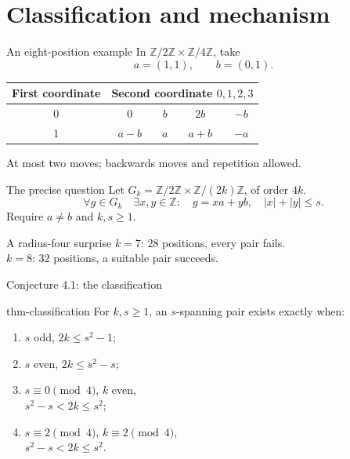 \documentclass{beamer}
\begin{document}
\section{Classification and mechanism}
\begin{frame}{An eight-position example}
In $\mathbb Z/2\mathbb Z\times\mathbb Z/4\mathbb Z$, take
\[a=(1,1),\qquad b=(0,1).\]
\begin{center}
\begin{tabular}{c|cccc}
First coordinate & \multicolumn{4}{c}{Second coordinate $0,1,2,3$}\\\hline
$0$ & $0$ & $b$ & $2b$ & $-b$\\
$1$ & $a-b$ & $a$ & $a+b$ & $-a$
\end{tabular}
\end{center}
At most two moves; backwards moves and repetition allowed.
\end{frame}
\begin{frame}{The precise question}
Let $G_k=\mathbb Z/2\mathbb Z\times\mathbb Z/(2k)\mathbb Z$, of order $4k$.
\[\forall g\in G_k\quad \exists x,y\in\mathbb Z:\quad
 g=xa+yb,\quad |x|+|y|\le s.\]
Require $a\ne b$ and $k,s\ge1$.
\begin{block}{A radius-four surprise}
$k=7$: $28$ positions, every pair fails.\\
$k=8$: $32$ positions, a suitable pair succeeds.
\end{block}
\end{frame}
\begin{frame}{Conjecture 4.1: the classification}
\begin{bookresult}{thm-classification}
For $k,s\ge1$, an $s$-spanning pair exists exactly when:
\begin{enumerate}
\item $s$ odd, $2k\le s^2-1$;
\item $s$ even, $2k\le s^2-s$;
\item $s\equiv0\pmod4$, $k$ even,\\
$s^2-s<2k\le s^2$;
\item $s\equiv2\pmod4$, $k\equiv2\pmod4$,\\
$s^2-s<2k\le s^2$.
\end{enumerate}
\end{bookresult}
\end{frame}
\end{document}
